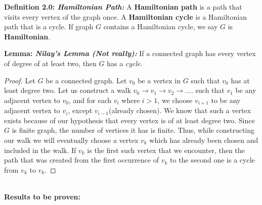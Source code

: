 \documentclass[12pt, fullpage]{article}
\begin{document}
\textbf{Definition 2.0: \textit{Hamiltonian Path:}} A \textbf{Hamiltonian path} is a path that visits every vertex of the graph once. A \textbf{Hamiltonian cycle} is a Hamiltonian path that is a cycle. If graph $G$ contains a Hamiltonian cycle, we say $G$ is \textbf{Hamiltonian}.
\newpage

\textbf{Lemma: \textit{Nilay's Lemma (Not really):}} If a connected graph has every vertex of degree of at least two, then $G$ has a \textit{cycle}.
\begin{proof}
Let $G$ be a connected graph. Let $v_0$ be a vertex in $G$ such that $v_0$ has at least degree two. Let us construct a walk $v_0 \rightarrow v_1 \rightarrow v_2 \rightarrow ....$ such that $v_1$ be any adjacent vertex to $v_0$, and for each $v_i$ where $i > 1$, we choose $v_{i+1}$ to be any adjacent vertex to $v_i$, except $v_{i-1}$(already chosen). We know that such a vertex exists because of our hypothesis that every vertex is of at least degree two. Since $G$ is finite graph, the number of vertices it has is finite. Thus, while constructing our walk we will eventually choose a vertex $v_k$ which has already been chosen and included in the walk. If $v_k$ is the first such vertex that we encounter, then the path that was created from the first occurrence of $v_k$ to the second one is a cycle from $v_k$ to $v_k$.
\end{proof}



\textbf{\\Results to be proven: }
\end{document}
